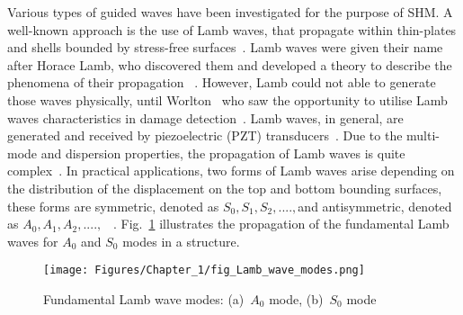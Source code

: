 Various types of guided waves have been investigated for the purpose of SHM. 
A well-known approach is the use of Lamb waves, that propagate 
within thin-plates and shells bounded by stress-free surfaces~\cite{Mitra2016}.
Lamb waves were given their name after Horace Lamb, who discovered them and 
developed a theory to describe the phenomena of their propagation 
~\cite{Ostachowicz2012}. 
However, Lamb could not able to generate those waves physically, until 
Worlton~\cite{Worlton1961} who saw the opportunity to utilise Lamb waves 
characteristics in damage detection~\cite{Ostachowicz2012}.
Lamb waves, in general, are generated and received by piezoelectric (PZT) 
transducers~\cite{Cai2012}.
Due to the multi-mode and dispersion properties, the propagation of Lamb waves 
is quite complex~\cite{Ostachowicz2012}. 
In practical applications, two forms of Lamb waves arise depending on the 
distribution of the displacement on the top and bottom bounding surfaces, these 
forms are symmetric, denoted as \(S_0,S_1,S_2,...., \)and antisymmetric, denoted as 
\(A_0,A_1,A_2,....,\) ~\cite{Ostachowicz2012}. 
Fig.~\ref{fig:LambModes} illustrates the propagation of the fundamental Lamb waves for \(A_0\) and \(S_0\) modes in a structure.
\begin{figure}[!ht]
	\begin{center}
		\centering
		\texttt{[image: Figures/Chapter\_1/fig\_Lamb\_wave\_modes.png]}
	\end{center}
	\caption{Fundamental Lamb wave modes: (a)~\(A_0\) mode, (b)~\( S_0\) mode} 
	\label{fig:LambModes}
\end{figure} 

